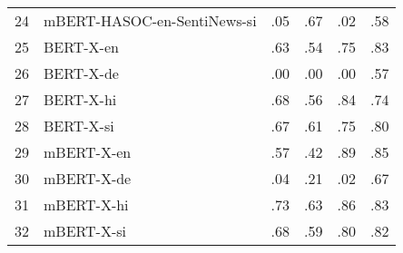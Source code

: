 \begin{tabular}{llrrrr}
24 &  mBERT-HASOC-en-SentiNews-si & .05 & .67 & .02 & .58 \\
25 &                    BERT-X-en & .63 & .54 & .75 & .83 \\
26 &                    BERT-X-de & .00 & .00 & .00 & .57 \\
27 &                    BERT-X-hi & .68 & .56 & .84 & .74 \\
28 &                    BERT-X-si & .67 & .61 & .75 & .80 \\
29 &                   mBERT-X-en & .57 & .42 & .89 & .85 \\
30 &                   mBERT-X-de & .04 & .21 & .02 & .67 \\
31 &                   mBERT-X-hi & .73 & .63 & .86 & .83 \\
32 &                   mBERT-X-si & .68 & .59 & .80 & .82 \\
\bottomrule
\end{tabular}
